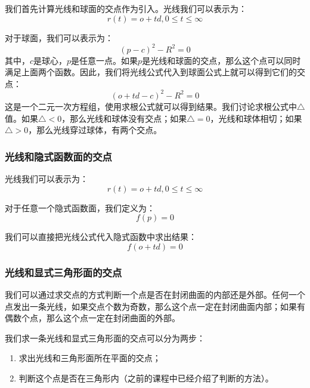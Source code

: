 \documentclass[openany]{progbookcn}
\begin{document}
我们首先计算光线和球面的交点作为引入。光线我们可以表示为：
\begin{equation}
	r(t)=o+td, 0\le t \le \infty
\end{equation}

对于球面，我们可以表示为：
\begin{equation}
	(p-c)^2-R^2=0
\end{equation}其中，$c$是球心，$p$是任意一点。如果$p$是光线和球面的交点，那么这个点可以同时满足上面两个函数。因此，我们将光线公式代入到球面公式上就可以得到它们的交点：
\begin{equation}
	(o+td-c)^2-R^2=0
\end{equation}
这是一个二元一次方程组，使用求根公式就可以得到结果。我们讨论求根公式中$\triangle$值。如果$\triangle < 0$，那么光线和球体没有交点；如果$\triangle = 0$，光线和球体相切；如果$\triangle > 0$，那么光线穿过球体，有两个交点。

\subsubsection{光线和隐式函数面的交点}

光线我们可以表示为：
\begin{equation}
	r(t)=o+td, 0\le t \le \infty
\end{equation}

对于任意一个隐式函数面，我们定义为：
\begin{equation}
	f(p)=0
\end{equation}

我们可以直接把光线公式代入隐式函数中求出结果：
\begin{equation}
	f(o+td)=0
\end{equation}

\subsubsection{光线和显式三角形面的交点}
我们可以通过求交点的方式判断一个点是否在封闭曲面的内部还是外部。任何一个点发出一条光线，如果交点个数为奇数，那么这个点一定在封闭曲面内部；如果有偶数个点，那么这个点一定在封闭曲面的外部。

我们求一条光线和显式三角形面的交点可以分为两步：
\begin{enumerate}
	\item 求出光线和三角形面所在平面的交点；
	\item 判断这个点是否在三角形内（之前的课程中已经介绍了判断的方法）。
\end{enumerate}
\end{document}

